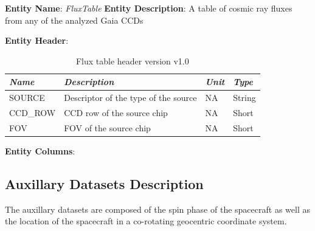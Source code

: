 \documentclass[a4paper, 11pt]{article}
\newcommand{\dmVersion}{v1.0}
\begin{document}
\textbf{Entity Name}:  \textit{FluxTable}
\newline
\newline
\textbf{Entity Description}:  A table of cosmic ray fluxes from any of the analyzed Gaia CCDs 
\newline
\newline


\textbf{Entity Header}:
\newline
\begin{table}[!h]
\centering
{\begin{tabular}{|l|l|l|l|}
\hline
{\textit{\textbf{Name}}} & {\textit{\textbf{Description}}} & {\textit{\textbf{Unit}}} & {\textit{\textbf{Type}}} \\ \hline
SOURCE & Descriptor of the type of the source & NA & String \\ \hline
CCD\_ROW & CCD row of the source chip & NA & Short \\ \hline
FOV & FOV of the source chip & NA & Short \\ \hline
\end{tabular}}
\caption{Flux table header version \dmVersion}
\end{table}


\textbf{Entity Columns}:
\newline
\begin{table}[!h]
\centering
{}
\caption{Flux table version \dmVersion}
\end{table}


\subsection{Auxillary Datasets Description}
\label{sec:AuxModel}
The auxillary datasets are composed of the spin phase of the spacecraft as well as the location of the spacecraft in a co-rotating geocentric coordinate system.
\end{document}
